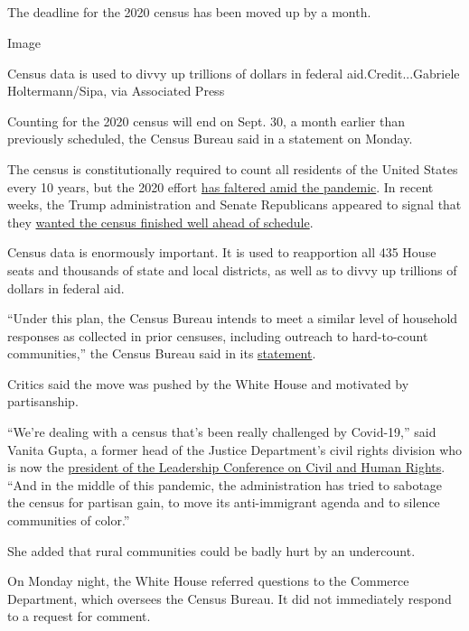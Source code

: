 \hypertarget{-10}{%
\subsection{}\label{-10}}

The deadline for the 2020 census has been moved up by a month.

Image

Census data is used to divvy up trillions of dollars in federal
aid.Credit...Gabriele Holtermann/Sipa, via Associated Press

Counting for the 2020 census will end on Sept. 30, a month earlier than
previously scheduled, the Census Bureau said in a statement on Monday.

The census is constitutionally required to count all residents of the
United States every 10 years, but the 2020 effort
\href{https://www.nytimes3xbfgragh.onion/2020/04/18/us/coronavirus-census.html}{has
faltered amid the pandemic}. In recent weeks, the Trump administration
and Senate Republicans appeared to signal that they
\href{https://www.nytimes3xbfgragh.onion/2020/07/28/us/trump-census.html}{wanted
the census finished well ahead of schedule}.

Census data is enormously important. It is used to reapportion all 435
House seats and thousands of state and local districts, as well as to
divvy up trillions of dollars in federal aid.

``Under this plan, the Census Bureau intends to meet a similar level of
household responses as collected in prior censuses, including outreach
to hard-to-count communities,'' the Census Bureau said in its
\href{https://www.census.gov/newsroom/press-releases/2020/delivering-complete-accurate-count.html}{statement}.

Critics said the move was pushed by the White House and motivated by
partisanship.

``We're dealing with a census that's been really challenged by
Covid-19,'' said Vanita Gupta, a former head of the Justice Department's
civil rights division who is now the
\href{https://civilrights.org/about/our-staff/vanita-gupta/}{president
of the Leadership Conference on Civil and Human Rights}. ``And in the
middle of this pandemic, the administration has tried to sabotage the
census for partisan gain, to move its anti-immigrant agenda and to
silence communities of color.''

She added that rural communities could be badly hurt by an undercount.

On Monday night, the White House referred questions to the Commerce
Department, which oversees the Census Bureau. It did not immediately
respond to a request for comment.

